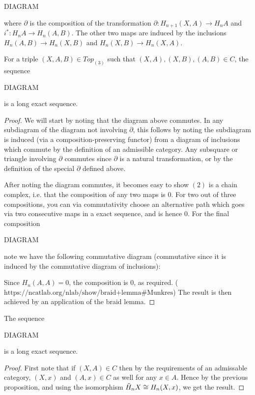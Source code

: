 DIAGRAM

where $\partial$ is the composition of the transformation $\partial:H_{n+1}(X,A)\rightarrow H_n A$ and $i^*:H_nA\rightarrow H_n(A,B)$. The other two maps are induced by the inclusions $H_n(A,B)\rightarrow H_n(X,B)$ and $H_n(X,B)\rightarrow H_n(X,A)$.

\begin{prop}
For a triple $(X,A,B)\in Top_{(3)}$ such that $(X,A),(X,B),(A,B)\in C$, the sequence

DIAGRAM 

is a long exact sequence.
\end{prop}
\begin{proof}
We will start by noting that the diagram above commutes. In any subdiagram of the diagram not involving $\partial$, this follows by noting the subdiagram is induced (via a composition-preserving functor) from a diagram of inclusions which commute by the definition of an admissible category. Any subsquare or triangle involving $\partial$ commutes since $\partial$ is a natural transformation, or by the definition of the special $\partial$ defined above.

After noting the diagram commutes, it becomes easy to show $(2)$ is a chain complex, i.e. that the composition of any two maps is $0$. For two out of three compositions, you can via commutativity choose an alternative path which goes via two consecutive maps in a exact sequence, and is hence $0$. For the final composition

DIAGRAM

note we have the following commutative diagram (commutative since it is induced by the commutative diagram of inclusions):

Since $H_n(A,A)=0$, the composition is $0$, as required. ($\text{https://ncatlab.org/nlab/show/braid+lemma\# Munkres}$) The result is then achieved by an application of the braid lemma.
\end{proof}

\begin{corollary}
The sequence

DIAGRAM

is a long exact sequence.
\end{corollary}
\begin{proof}
First note that if $(X,A)\in C$ then by the requirements of an admissable category, $(X,x)$ and $(A,x)\in C$ as well for any $x\in A$. Hence by the previous proposition, and using the isomorphism $\tilde{H}_n X\cong H_n(X,x)$, we get the result.
\end{proof}